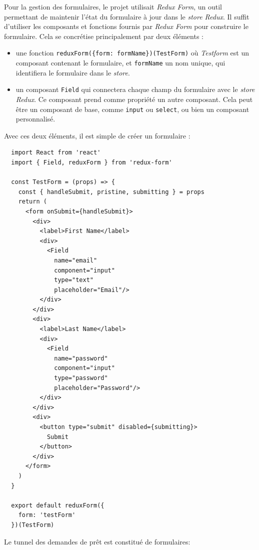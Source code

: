 \documentclass[12pt,a4paper]{article}
\providecommand{\tightlist}{%
  \setlength{\itemsep}{0pt}\setlength{\parskip}{0pt}}
\begin{document}
  \bigskip

  Pour la gestion des formulaires, le projet utilisait \emph{Redux Form},
  un outil permettant de maintenir l'état du formulaire à jour dans le
  \emph{store Redux}. Il suffit d'utiliser les composants et fonctions
  fournis par \emph{Redux Form} pour construire le formulaire. Cela se
  concrétise principalement par deux éléments :

  \begin{itemize}
  \tightlist
  \item
    une fonction
    \texttt{reduxForm(\{form:\ \textquotesingle{}formName\textquotesingle{}\})(TestForm)}
    où \emph{Testform} est un composant contenant le formulaire, et
    \texttt{formName} un nom unique, qui identifiera le formulaire dans le
    \emph{store}.
  \item
    un composant \texttt{Field} qui connectera chaque champ du formulaire
    avec le \emph{store Redux}. Ce composant prend comme propriété un
    autre composant. Cela peut être un composant de base, comme
    \texttt{input} ou \texttt{select}, ou bien un composant personnalisé.
  \end{itemize}

  Avec ces deux éléments, il est simple de créer un formulaire :

  \begin{verbatim}
  import React from 'react'
  import { Field, reduxForm } from 'redux-form'

  const TestForm = (props) => {
    const { handleSubmit, pristine, submitting } = props
    return (
      <form onSubmit={handleSubmit}>
        <div>
          <label>First Name</label>
          <div>
            <Field
              name="email"
              component="input"
              type="text"
              placeholder="Email"/>
          </div>
        </div>
        <div>
          <label>Last Name</label>
          <div>
            <Field
              name="password"
              component="input"
              type="password"
              placeholder="Password"/>
          </div>
        </div>
        <div>
          <button type="submit" disabled={submitting}>
            Submit
          </button>
        </div>
      </form>
    )
  }

  export default reduxForm({
    form: 'testForm'
  })(TestForm)
  \end{verbatim}

  \bigskip

  Le tunnel des demandes de prêt est constitué de formulaires:
\end{document}
